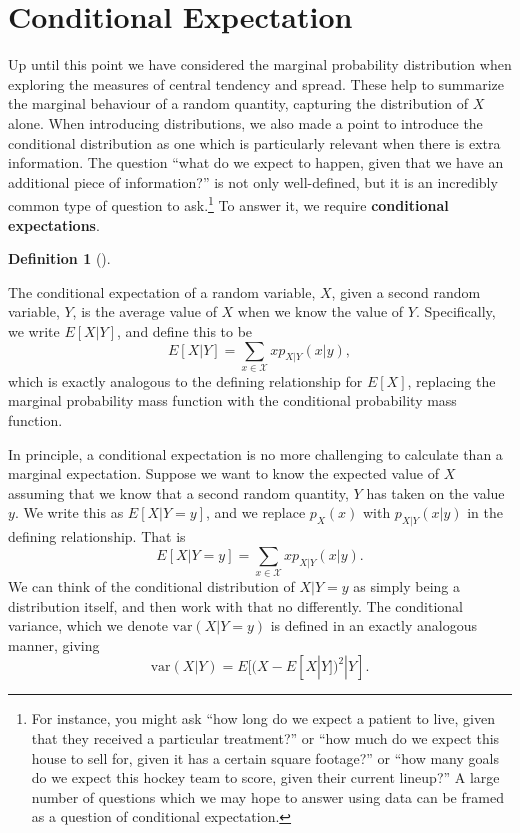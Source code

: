 \documentclass[
  letterpaper,
  DIV=11,
  numbers=noendperiod]{scrreprt}
\theoremstyle{definition}
\theoremstyle{definition}
\theoremstyle{definition}
\newtheorem{definition}{Definition}[chapter]
\theoremstyle{remark}
\begin{document}
\section{Conditional Expectation}\label{conditional-expectation}

Up until this point we have considered the marginal probability
distribution when exploring the measures of central tendency and spread.
These help to summarize the marginal behaviour of a random quantity,
capturing the distribution of \(X\) alone. When introducing
distributions, we also made a point to introduce the conditional
distribution as one which is particularly relevant when there is extra
information. The question ``what do we expect to happen, given that we
have an additional piece of information?'' is not only well-defined, but
it is an incredibly common type of question to ask.\footnote{For
  instance, you might ask ``how long do we expect a patient to live,
  given that they received a particular treatment?'' or ``how much do we
  expect this house to sell for, given it has a certain square
  footage?'' or ``how many goals do we expect this hockey team to score,
  given their current lineup?'' A large number of questions which we may
  hope to answer using data can be framed as a question of conditional
  expectation.} To answer it, we require \textbf{conditional
expectations}.

\begin{definition}[]\protect\hypertarget{def-conditional-expectation}{}\label{def-conditional-expectation}

The conditional expectation of a random variable, \(X\), given a second
random variable, \(Y\), is the average value of \(X\) when we know the
value of \(Y\). Specifically, we write \(E[X|Y]\), and define this to be
\[E[X|Y] = \sum_{x\in\mathcal{X}} xp_{X|Y}(x|y),\] which is exactly
analogous to the defining relationship for \(E[X]\), replacing the
marginal probability mass function with the conditional probability mass
function.

\end{definition}

In principle, a conditional expectation is no more challenging to
calculate than a marginal expectation. Suppose we want to know the
expected value of \(X\) assuming that we know that a second random
quantity, \(Y\) has taken on the value \(y\). We write this as
\(E[X|Y=y]\), and we replace \(p_X(x)\) with \(p_{X|Y}(x|y)\) in the
defining relationship. That is
\[E[X|Y=y] = \sum_{x\in\mathcal{X}}xp_{X|Y}(x|y).\] We can think of the
conditional distribution of \(X|Y=y\) as simply being a distribution
itself, and then work with that no differently. The conditional
variance, which we denote \(\text{var}(X|Y=y)\) is defined in an exactly
analogous manner, giving \[\text{var}(X|Y) = E[(X - E[X|Y])^2|Y].\]
\end{document}
